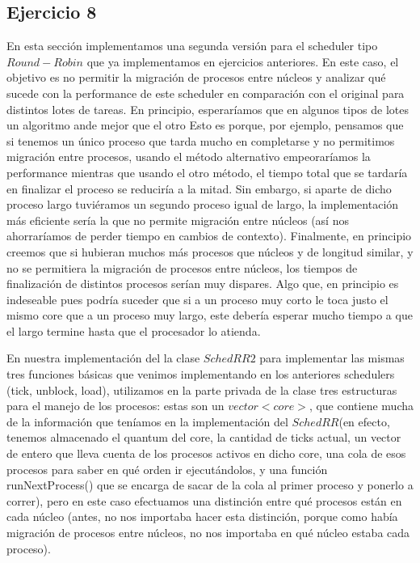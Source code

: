 \documentclass[11pt, a4paper, twoside]{article}
\begin{document}
\subsection{Ejercicio 8}
En esta sección implementamos una segunda versión para el scheduler tipo $Round-Robin$ que ya implementamos
en ejercicios anteriores. En este caso, el objetivo es no permitir la migración de procesos entre núcleos y
analizar qué sucede con la performance de este scheduler en comparación con el original para distintos lotes
de tareas. En principio, esperaríamos que en algunos tipos de lotes un algoritmo ande mejor que el otro
Esto es porque, por ejemplo, pensamos que si tenemos un 
único proceso que tarda mucho en completarse y no permitimos migración entre procesos, usando el método 
alternativo empeoraríamos la performance mientras que usando el otro método, el tiempo total que se tardaría
en finalizar el proceso se reduciría a la mitad. Sin embargo, si aparte de dicho proceso largo tuviéramos un
segundo proceso igual de largo, la implementación más eficiente sería la que no permite migración entre 
núcleos (así nos ahorraríamos de perder tiempo en cambios de contexto). Finalmente, en principio creemos que
si hubieran muchos más procesos que núcleos y de longitud similar, 
y no se permitiera la migración de procesos entre núcleos, los tiempos de finalización de distintos 
procesos serían muy dispares. Algo que, en principio es indeseable pues podría suceder que si a un proceso muy 
corto le toca justo el mismo core que a un proceso muy largo, este debería esperar mucho tiempo a que el largo
termine hasta que el procesador lo atienda. 

En nuestra implementación del la clase $SchedRR2$ para implementar las mismas tres funciones básicas que venimos
implementando en los anteriores schedulers (tick, unblock, load), utilizamos en la parte privada de la clase tres
estructuras para el manejo de los procesos: estas son un $vector<core>$, que contiene mucha de la información 
que teníamos en la implementación del $SchedRR$(en efecto, tenemos almacenado el quantum del core, la cantidad de
ticks actual, un vector de entero que lleva cuenta de los procesos activos en dicho core, una cola de esos procesos para
saber en qué orden ir ejecutándolos, y una función runNextProcess() que se encarga de sacar de la cola al
primer proceso y ponerlo a correr), pero en este caso efectuamos una distinción entre qué procesos están en cada
núcleo (antes, no nos importaba hacer esta distinción, porque como había migración de procesos entre 
núcleos, no nos importaba en qué núcleo estaba cada proceso). 
\end{document}
